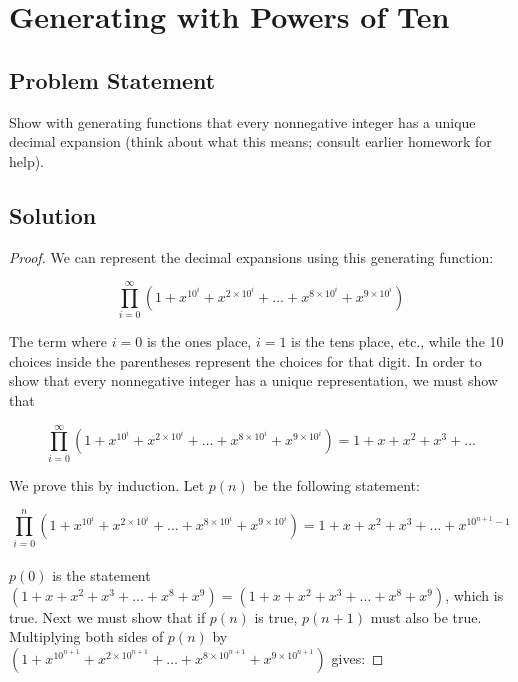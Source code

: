\documentclass[12pt]{article}
\newcommand{\ProblemStatement}[1]{
\subsection*{Problem Statement}
#1
\subsection*{Solution}
}
\begin{document}
\section{Generating with Powers of Ten}
\ProblemStatement{
Show with generating functions that every nonnegative integer has a unique
decimal expansion (think about what this means; consult earlier homework for
help).
}

\begin{proof}
We can represent the decimal expansions using this generating function:

\[
\prod_{i=0}^{\infty} \left(1 + x^{10^i} + x^{2\times10^i} + \dots + x^{8\times10^i} + x^{9\times10^i}\right)
\]

The term where $i=0$ is the ones place, $i=1$ is the tens place, etc., while the 10 choices inside the parentheses represent the choices for that digit. In order to show that every nonnegative integer has a unique representation, we must show that 

\[
\prod_{i=0}^{\infty} \left(1 + x^{10^i} + x^{2\times10^i} + \dots + x^{8\times10^i} + x^{9\times10^i}\right) = 1 + x + x^2 + x^3 + \dots
\]

We prove this by induction. Let $p(n)$ be the following statement:

\[
\prod_{i=0}^{n} \left(1 + x^{10^i} + x^{2\times10^i} + \dots + x^{8\times10^i} + x^{9\times10^i}\right) = 1 + x + x^2 + x^3 + \dots + x^{10^{n+1}-1}
\]
\\
$p(0)$ is the statement $(1 + x + x^2 + x^3 + \dots + x^8 + x^9) = (1 + x + x^2 + x^3+ \dots + x^8 + x^9)$, which is true. Next we must show that if $p(n)$ is true, $p(n+1)$ must also be true.\\


Multiplying both sides of $p(n)$ by $(1 + x^{10^{n+1}} + x^{2\times10^{n+1}} + \dots + x^{8\times10^{n+1}} + x^{9\times10^{n+1}})$ gives:


\end{proof}
\end{document}
